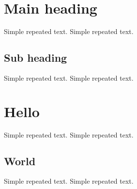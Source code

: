 \documentclass{article}
\begin{document}
\tableofcontents

\section{Main heading}

Simple repeated text.
Simple repeated text.

\subsection{Sub heading}

Simple repeated text.
Simple repeated text.

\section{Hello}

Simple repeated text.
Simple repeated text.

\subsection{World}

Simple repeated text.
Simple repeated text.
\end{document}
